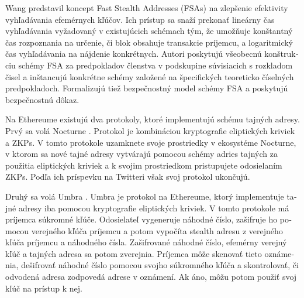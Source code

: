 \begin{otherlanguage}{slovak}
Wang \cite{Wang2023} predstavil koncept Fast Stealth Addresses (FSAs) na
zlepšenie efektivity vyhľadávania efemérnych kľúčov. Ich prístup sa snaží prekonať lineárny čas vyhľadávania
vyžadovaný v existujúcich schémach tým, že umožňuje konštantný čas rozpoznania
na určenie, či blok obsahuje transakcie príjemcu, a logaritmický čas
vyhľadávania na nájdenie konkrétnych. Autori poskytujú všeobecnú
konštrukciu schémy FSA za predpokladov členstva v podskupine súvisiacich s
rozkladom čisel a inštancujú konkrétne schémy založené na špecifických
teoreticko číselných predpokladoch. Formalizujú tiež bezpečnostný model schémy
FSA a poskytujú bezpečnostnú dôkaz.

Na Ethereume existujú dva protokoly, ktoré implementujú schému tajných adresy. Prvý
sa volá Nocturne \cite{nocturne}. Protokol je kombináciou kryptografie eliptických
kriviek a ZKPs. V tomto protokole uzamknete svoje prostriedky v ekosystéme Nocturne,
v ktorom sa nové tajné adresy vytvárajú pomocou schémy adries tajných za použitia eliptických kriviek a k
svojim prostriedkom pristupujete odosielaním ZKPs. Podľa ich príspevku na Twitteri však svoj protokol
ukončujú.

Druhý sa volá Umbra \cite{umbra}. Umbra je protokol na Ethereume, ktorý implementuje
tajné adresy iba pomocou kryptografie eliptických kriviek. V tomto protokole má
príjemca súkromné kľúče. Odosielateľ vygeneruje náhodné číslo, zašifruje ho
pomocou verejného kľúča príjemcu a potom vypočíta stealth adresu z verejného
kľúča príjemcu a náhodného čísla. Zašifrované náhodné číslo, efemérny verejný
kľúč a tajných adresa sa potom zverejnia. Príjemca môže skenovať tieto
oznámenia, dešifrovať náhodné číslo pomocou svojho súkromného kľúča a
skontrolovať, či odvodená adresa zodpovedá adrese v oznámení. Ak áno,
môžu potom použiť svoj kľúč na prístup k nej.


\end{otherlanguage}
